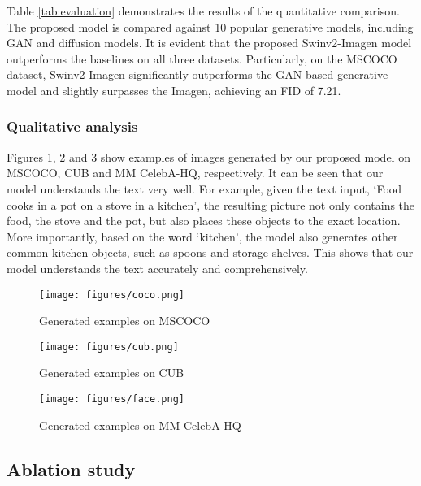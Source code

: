 \documentclass{article}
\begin{document}
Table \ref{tab:evaluation} demonstrates the results of the quantitative comparison. The proposed model is compared against 10 popular generative models, including GAN and diffusion models. It is evident that the proposed Swinv2-Imagen model outperforms the baselines on all three datasets. Particularly, on the MSCOCO dataset, Swinv2-Imagen significantly outperforms the GAN-based generative model and slightly surpasses the Imagen, achieving an FID of 7.21.

\subsubsection{Qualitative analysis}
Figures \ref{fig:coco}, \ref{fig:cub} and \ref{fig:face} show examples of images generated by our proposed model on MSCOCO, CUB and MM CelebA-HQ, respectively. It can be seen that our model understands the text very well. For example, given the text input, ‘Food cooks in a pot on a stove in a kitchen’, the resulting picture not only contains the food, the stove and the pot, but also places these objects to the exact location. More importantly, based on the word ‘kitchen’, the model also generates other common kitchen objects, such as spoons and storage shelves. This shows that our model understands the text accurately and comprehensively.

\begin{figure}
    \centering
    \texttt{[image: figures/coco.png]}
    \caption{Generated examples on MSCOCO}
    \label{fig:coco}
\end{figure}

\begin{figure}
    \centering
    \texttt{[image: figures/cub.png]}
    \caption{Generated examples on CUB}
    \label{fig:cub}
\end{figure}

\begin{figure}
    \centering
    \texttt{[image: figures/face.png]}
    \caption{Generated examples on MM CelebA-HQ}
    \label{fig:face}
\end{figure}

\subsection{Ablation study}
\end{document}
